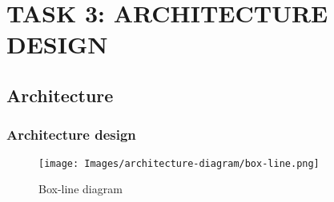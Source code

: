 \section{TASK 3: ARCHITECTURE DESIGN}
\subsection{Architecture}
\subsubsection{Architecture design}

\begin{figure}[H]
    \centering
\texttt{[image: Images/architecture-diagram/box-line.png]}
    \vspace{0.1cm}
    \par
    \caption{Box-line diagram}
\end{figure}

